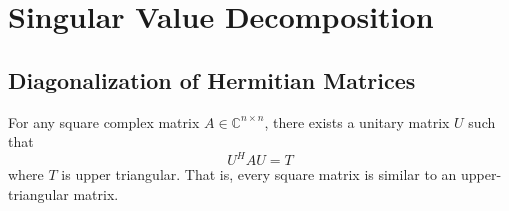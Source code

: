 \chapter{Singular Value Decomposition}



\section{Diagonalization of Hermitian Matrices}

\begin{lemma}
For any square complex matrix $A \in \mathbb C^{n\times n}$, there exists a unitary matrix $U$ such that
\begin{equation*}
U^H A U = T
\end{equation*}
where $T$ is upper triangular.
That is, every square matrix is similar to an upper-triangular matrix.
\end{lemma}

